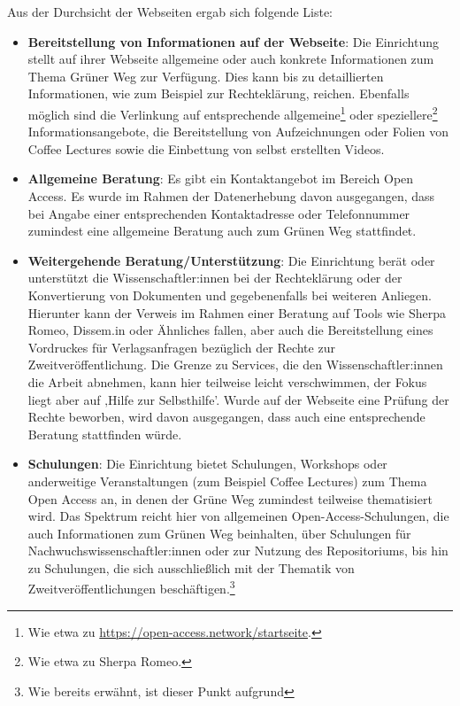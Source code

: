 \documentclass[a4paper,
fontsize=11pt,
oneside,
numbers=noperiodatend,
parskip=half-,
bibliography=totoc,
final
]{scrartcl}
\begin{document}
Aus der Durchsicht der Webseiten ergab sich folgende Liste:

\begin{itemize}
\item
  \textbf{Bereitstellung von Informationen auf der Webseite}: Die
  Einrichtung stellt auf ihrer Webseite allgemeine oder auch konkrete
  Informationen zum Thema Grüner Weg zur Verfügung. Dies kann bis zu
  detaillierten Informationen, wie zum Beispiel zur Rechteklärung,
  reichen. Ebenfalls möglich sind die Verlinkung auf entsprechende
  allgemeine\footnote{Wie etwa zu
    \url{https://open-access.network/startseite}.} oder
  speziellere\footnote{Wie etwa zu Sherpa Romeo.} Informationsangebote,
  die Bereitstellung von Aufzeichnungen oder Folien von Coffee Lectures
  sowie die Einbettung von selbst erstellten Videos.
\item
  \textbf{Allgemeine Beratung}: Es gibt ein Kontaktangebot im Bereich
  Open Access. Es wurde im Rahmen der Datenerhebung davon ausgegangen,
  dass bei Angabe einer entsprechenden Kontaktadresse oder Telefonnummer
  zumindest eine allgemeine Beratung auch zum Grünen Weg stattfindet.
\item
  \textbf{Weitergehende Beratung/Unterstützung}: Die Einrichtung berät
  oder unterstützt die Wissenschaftler:innen bei der Rechteklärung oder
  der Konvertierung von Dokumenten und gegebenenfalls bei weiteren
  Anliegen. Hierunter kann der Verweis im Rahmen einer Beratung auf
  Tools wie Sherpa Romeo, Dissem.in oder Ähnliches fallen, aber auch die
  Bereitstellung eines Vordruckes für Verlagsanfragen bezüglich der
  Rechte zur Zweitveröffentlichung. Die Grenze zu Services, die den
  Wissenschaftler:innen die Arbeit abnehmen, kann hier teilweise leicht
  verschwimmen, der Fokus liegt aber auf ‚Hilfe zur Selbsthilfe'. Wurde
  auf der Webseite eine Prüfung der Rechte beworben, wird davon
  ausgegangen, dass auch eine entsprechende Beratung stattfinden würde.
\item
  \textbf{Schulungen}: Die Einrichtung bietet Schulungen, Workshops oder
  anderweitige Veranstaltungen (zum Beispiel Coffee Lectures) zum Thema
  Open Access an, in denen der Grüne Weg zumindest teilweise
  thematisiert wird. Das Spektrum reicht hier von allgemeinen
  Open-Access-Schulungen, die auch Informationen zum Grünen Weg
  beinhalten, über Schulungen für Nachwuchswissenschaftler:innen oder
  zur Nutzung des Repositoriums, bis hin zu Schulungen, die sich
  ausschließlich mit der Thematik von Zweitveröffentlichungen
  beschäftigen.\footnote{Wie bereits erwähnt, ist dieser Punkt aufgrund
}
\end{itemize}
\end{document}

